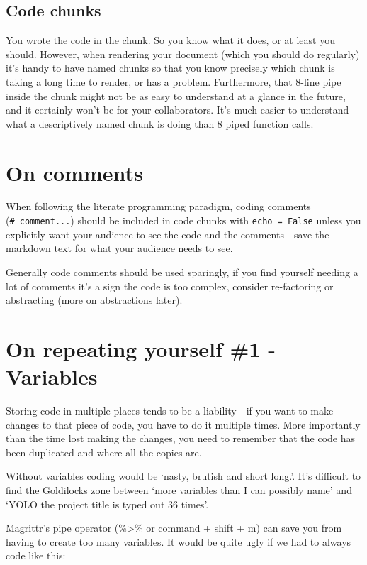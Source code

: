 \documentclass[
  letterpaper,
  DIV=11,
  numbers=noendperiod]{scrreprt}
\begin{document}
\subsection{Code chunks}\label{code-chunks}

You wrote the code in the chunk. So you know what it does, or at least
you should. However, when rendering your document (which you should do
regularly) it's handy to have named chunks so that you know precisely
which chunk is taking a long time to render, or has a problem.
Furthermore, that 8-line pipe inside the chunk might not be as easy to
understand at a glance in the future, and it certainly won't be for your
collaborators. It's much easier to understand what a descriptively named
chunk is doing than 8 piped function calls.

\section{On comments}\label{on-comments}

When following the literate programming paradigm, coding comments
(\texttt{\#\ comment...}) should be included in code chunks with
\texttt{echo\ =\ False} unless you explicitly want your audience to see
the code and the comments - save the markdown text for what your
audience needs to see.

Generally code comments should be used sparingly, if you find yourself
needing a lot of comments it's a sign the code is too complex, consider
re-factoring or abstracting (more on abstractions later).

\section{On repeating yourself \#1 -
Variables}\label{on-repeating-yourself-1---variables}

Storing code in multiple places tends to be a liability - if you want to
make changes to that piece of code, you have to do it multiple times.
More importantly than the time lost making the changes, you need to
remember that the code has been duplicated and where all the copies are.

Without variables coding would be `nasty, brutish and short long.'. It's
difficult to find the Goldilocks zone between `more variables than I can
possibly name' and `YOLO the project title is typed out 36 times'.

Magrittr's pipe operator (\%\textgreater\% or command + shift + m) can
save you from having to create too many variables. It would be quite
ugly if we had to always code like this:
\end{document}
